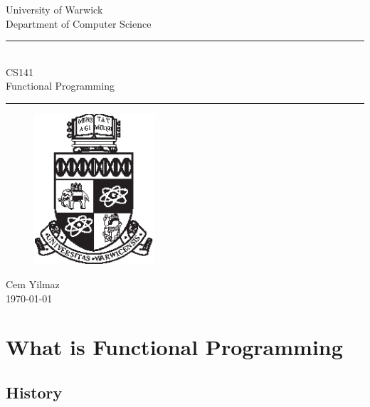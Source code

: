 \documentclass[a4paper]{article}
\theoremstyle{plain}
\theoremstyle{definition}
\theoremstyle{remark}
\begin{document}
	\begin{titlepage}
	\begin{center}
	\large
	University of Warwick \\
	Department of Computer Science \\
	\huge
	\vspace{50mm}
	\rule{\linewidth}{0.5pt} \\
	CS141 \\
	\vspace{5mm}
	\Large
	Functional Programming
	\rule{\linewidth}{0.5pt}
	\vspace{5mm}
	\begin{figure}[H]
	\centering
	\includegraphics[width=0.4\textwidth]{crest_black.eps}
	\end{figure}
	\vspace{37mm}
	Cem Yilmaz \\
	\today
	\end{center}
	\end{titlepage}
	\newpage
	\tableofcontents
	\newpage
	\section{What is Functional Programming}
	\subsection{History}
	
\end{document}
